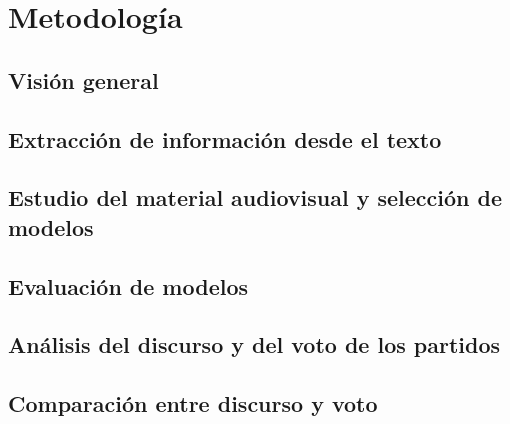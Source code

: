 \chapter{Metodología}
\label{cap:metodologia}

\section{Visión general}
\label{sec:vision-general}

\section{Extracción de información desde el texto}
\label{sec:extraccion-texto}

\section{Estudio del material audiovisual y selección de modelos}
\label{sec:metodo-audiovisual}

\section{Evaluación de modelos}
\label{sec:metodo-evaluacion}

\section{Análisis del discurso y del voto de los partidos}
\label{sec:metodo-discurso-voto}

\section{Comparación entre discurso y voto}
\label{sec:metodo-comparacion}
